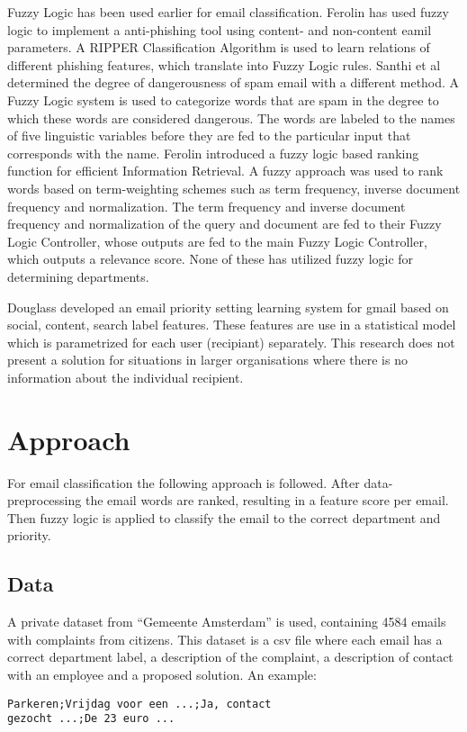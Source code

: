 \documentclass[journal]{IEEEtran}
\begin{document}
Fuzzy Logic has been used earlier for email classification. Ferolin \cite{phishing}
has used fuzzy logic to implement a anti-phishing tool using content- and non-content eamil parameters. A RIPPER Classification Algorithm is used to learn relations of different phishing features, which translate into Fuzzy Logic rules. Santhi et al \cite{spam} determined the degree of dangerousness of spam email with a different method. A Fuzzy Logic system is used to categorize words that are spam in the degree to which these words are considered dangerous. The words are labeled to the names of five linguistic variables before they are fed to the particular input that corresponds with the name. Ferolin \cite{ranking} introduced a fuzzy logic based ranking function for efficient Information Retrieval. A fuzzy approach was used to rank words based on term-weighting schemes such as term frequency, inverse document frequency and normalization. The term frequency and inverse document frequency and normalization of the query and document are fed to their Fuzzy Logic Controller, whose outputs are fed to the main Fuzzy Logic Controller, which outputs a relevance score. None of these has utilized fuzzy logic for determining departments.

Douglass \cite{ranking} developed an email priority setting learning system for gmail based on social, content, search label features. These features are use in a statistical model which is parametrized for each user (recipiant) separately. This research does not present a solution for situations in larger organisations where there is no information about the individual recipient.

\section{Approach}
For email classification the following approach is followed. After data-preprocessing the email words are ranked, resulting in a feature score per email. Then fuzzy logic is applied to classify the email to the correct department and priority.

\subsection{Data}

A private dataset from ``Gemeente Amsterdam'' is used, containing 4584 emails with complaints from citizens.
This dataset is a csv file where each email has a correct department label, a description of the complaint, a description of contact with an employee and a proposed solution.
An example:
\begin{lstlisting}
Parkeren;Vrijdag voor een ...;Ja, contact
gezocht ...;De 23 euro ...
\end{lstlisting}
\end{document}
